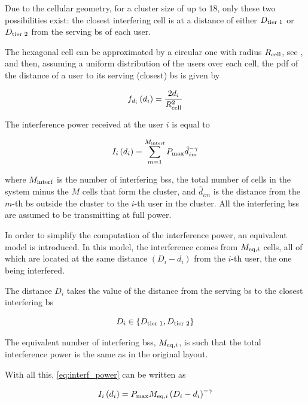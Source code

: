 Due to the cellular geometry, for a cluster size of up to 18, only these two
possibilities exist: the closest interfering cell is at a distance of either
$D_{\text{tier 1}}$ or $D_{\text{tier 2}}$ from the serving \gls{bs} of each user.

The hexagonal cell can be approximated by a circular one with radius $R_{\text{cell}}$,
see , and then, assuming a uniform distribution
of the users over each cell, the \gls{pdf} of the distance of a user to its
serving (closest) \gls{bs} is given by

\begin{equation} \label{eq:pdf_distance}
    f_{d_i}\left(d_i\right) = \frac{2d_i}{R_{\text{cell}}^2}
\end{equation}

The interference power received at the user $i$ is equal to

\begin{equation} \label{eq:interf_power}
    I_i\left( d_i \right) = \sum\limits_{m=1}^{M_{\text{interf}}}P_{\max}
    \hat{d}_{im}^{-\gamma}
\end{equation}

\noindent
where $M_{\text{interf}}$ is the number of interfering \glspl{bs}, \ie the total
number of cells in the system minus the $M$ cells that form the cluster, and
$\hat{d}_{im}$ is the distance from the $m$-th \gls{bs} outside the cluster to
the $i$-th user in the cluster. All the interfering \glspl{bs} are assumed to be
transmitting at full power.

In order to simplify the computation of the interference power, an equivalent
model is introduced. In this model, the interference comes from $M_{\text{eq},i}$ cells,
all of which are located at the same distance $\left(D_i - d_i\right)$ from the
$i$-th user, the one being interfered. 

The distance $D_i$ takes the value of the distance from the serving \gls{bs} to
the closest interfering \gls{bs}

\begin{equation} \label{eq:interf_min_dist}
    D_i \in \left\{ D_{\text{tier 1}}, D_{\text{tier 2}} \right\}
\end{equation}

The equivalent number of interfering \glspl{bs}, $M_{\text{eq},i}$, is such that the total
interference power is the same as in the original layout.

With all this, \eqref{eq:interf_power} can be written as

\begin{equation} \label{eq:interf_power_eq}
    I_i\left(d_i\right) = P_{\max}M_{\text{eq},i}\left(D_i - d_i\right)^{-\gamma}
\end{equation}

